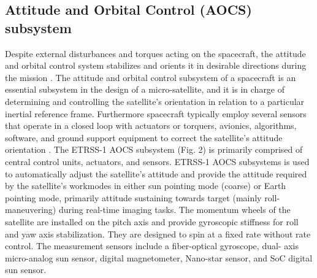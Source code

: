 \documentclass[final,5p,times,twocolumn]{elsarticle}
\begin{document}
\subsection{Attitude and Orbital Control (AOCS) subsystem}
Despite external disturbances and torques acting on the spacecraft, the attitude and orbital control system stabilizes and orients it in desirable directions during the mission \cite{larson1992space}. The attitude and orbital control subsystem of a spacecraft is an essential subsystem in the design of a micro-satellite, and it is in charge of determining and controlling the satellite's orientation in relation to a particular inertial reference frame. Furthermore spacecraft typically employ several sensors that operate in a closed loop with actuators or torquers, avionics, algorithms, software, and ground support equipment to correct the satellite's attitude orientation \cite{Wertz2011SpaceME}. The ETRSS-1 AOCS subsystem (Fig. 2) is primarily comprised of central control units, actuators, and sensors. ETRSS-1 AOCS subsystems is used to automatically adjust the satellite's attitude and provide the attitude required by the satellite's workmodes in either sun pointing mode (coarse) or Earth pointing mode, primarily attitude sustaining towards target (mainly roll-maneuvering) during real-time imaging tasks. The momentum wheels of the satellite are installed on the pitch axis and provide gyroscopic stiffness for roll and yaw axis stabilization. They are designed to spin at a fixed rate without rate control. The measurement sensors include a fiber-optical gyroscope, dual- axis micro-analog sun sensor, digital magnetometer, Nano-star sensor, and SoC digital sun sensor.
\end{document}
